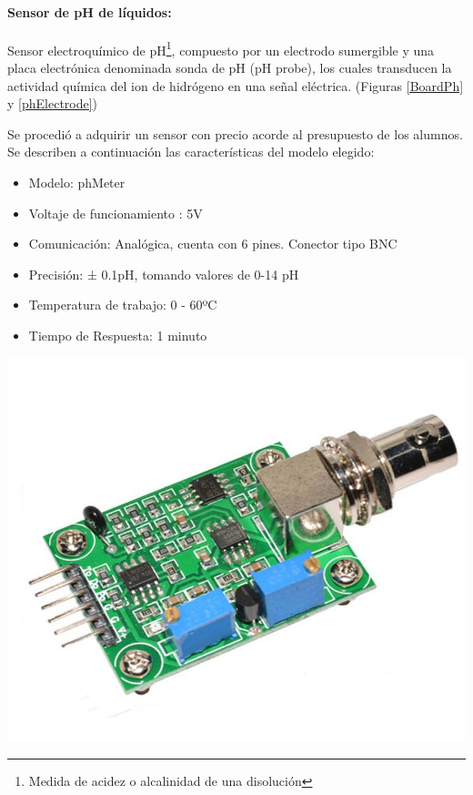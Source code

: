             \paragraph{Sensor de pH de líquidos:}Sensor electroquímico de pH\footnote{ Medida de acidez o alcalinidad de una disolución}, compuesto por un electrodo sumergible y una placa electrónica denominada sonda de pH (pH probe), los cuales transducen la actividad química del ion de hidrógeno en una señal eléctrica. (Figuras \ref{BoardPh} y \ref{phElectrode})
                
                \par Se procedió a adquirir un sensor con precio acorde al presupuesto de los alumnos. Se describen a continuación las características del modelo elegido:
                
                \begin{itemize}
                    \item Modelo: phMeter
                    \item Voltaje de funcionamiento : 5V
                    \item Comunicación: Analógica, cuenta con 6 pines. Conector tipo BNC
                    \item Precisión: ± 0.1pH, tomando valores de 0-14 pH
                    \item Temperatura de trabajo: 0 - 60ºC
                    \item Tiempo de Respuesta: 1 minuto
                \end{itemize}
                
                \begin{minipage}{0.95\textwidth}
                    \begin{center}
                    \includegraphics[scale=0.25]{hardware/phmoduloplaca.jpg}
                    \label{BoardPh}
                    \end{center}
                \end{minipage}
                
